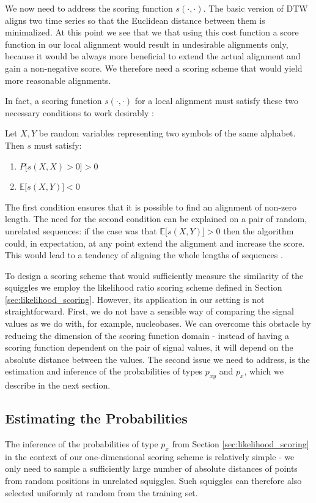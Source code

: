 We now need to address the scoring function $s(\cdot, \cdot)$. The basic version of DTW aligns two time series so that the Euclidean distance between them is minimalized. At this point we see that we that using this cost function a score function in our local alignment would result in undesirable alignments only, because it would be always more beneficial to extend the actual alignment and gain a non-negative score. We therefore need a scoring scheme that would yield more reasonable alignments.

In fact, a scoring function $s(\cdot, \cdot)$ for a local alignment must satisfy these two necessary conditions to work desirably \cite{rosenberg2009sequence}:

Let $X, Y$ be random variables representing two symbols of the same alphabet. Then $s$ must satisfy:
\begin{enumerate}
    \item $P\big[s(X, X) > 0 \big] > 0$
    \item $\mathbb{E}\big[ s(X, Y) \big] < 0$
\end{enumerate}

The first condition ensures that it is possible to find an alignment of non-zero length. The need for the second condition can be explained on a pair of random, unrelated sequences: if the case was that $\mathbb{E}\big[ s(X, Y) \big] > 0$ then the algorithm could, in expectation, at any point extend the alignment and increase the score. This would lead to a tendency of aligning the whole lengths of sequences \cite{rosenberg2009sequence}.

To design a scoring scheme that would sufficiently measure the similarity of the squiggles we employ the likelihood ratio scoring scheme defined in Section \ref{sec:likelihood_scoring}. However, its application in our setting is not straightforward. First, we do not have a sensible way of comparing the signal values as we do with, for example, nucleobases. We can overcome this obstacle by reducing the dimension of the scoring function domain - instead of having a scoring function dependent on the pair of signal values, it will depend on the absolute distance between the values. The second issue we need to address, is the estimation and inference of the probabilities of types $p_{xy}$ and $p_x$, which we describe in the next section.

\subsection{Estimating the Probabilities}
The inference of the probabilities of type $p_x$ from Section \ref{sec:likelihood_scoring} in the context of our one-dimensional scoring scheme is relatively simple - we only need to sample a sufficiently large number of absolute distances of points from random positions in unrelated squiggles. Such squiggles can therefore also selected uniformly at random from the training set.

